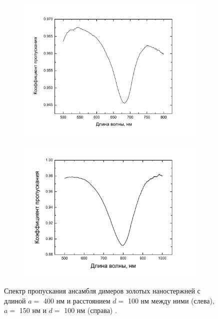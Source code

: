 \begin{figure}
\centering
\begin{subfigure}{.5\textwidth}
  \centering
  \includegraphics[width=1\linewidth]{img/microspectroscopy/a400d300_spectra.pdf}
  \label{img:Spectraa5d3}
\end{subfigure}%
\begin{subfigure}{.5\textwidth}
  \centering
  \includegraphics[width=1\linewidth]{img/microspectroscopy/a150d100_spectra.pdf}
  \label{img:Spectraa1d1}
\end{subfigure}
\caption{Спектр пропускания ансамбля димеров золотых наностержней с длиной  $ a = $ 400 нм и расстоянием $ d = $ 100 нм между ними (слева), $ a = $ 150 нм и $ d = $  100 нм (справа) .}
\label{img:res}
\end{figure}

